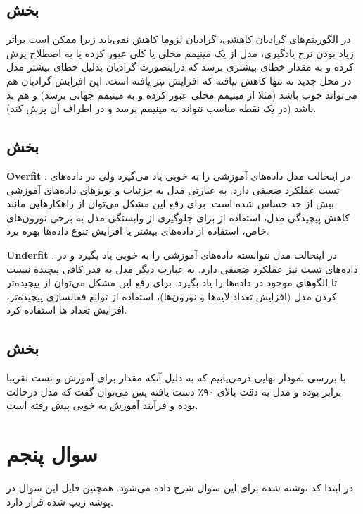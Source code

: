 \documentclass[12pt]{article}
\begin{document}
	\subsection{بخش }
	در الگوریتم‌های گرادیان کاهشی، گرادیان لزوما کاهش نمی‌یابد زیرا ممکن است براثر زیاد بودن نرخ یادگیری، مدل از یک مینیمم محلی یا کلی عبور کرده یا به اصطلاح پرش کرده و به مقدار خطای بیشتری برسد که دراینصورت گرادیان بدلیل خطای بیشتر مدل در محل جدید نه تنها کاهش نیافته که افزایش نیز یافته است. این افزایش گرادیان هم می‌تواند خوب باشد (مثلا از مینیمم محلی عبور کرده و به مینیمم جهانی برسد) و هم بد باشد (در یک نقطه مناسب نتواند به مینیمم برسد و در اطراف آن پرش کند).
	\subsection{بخش }
	\textbf{Overfit} : در اینحالت مدل داده‌های آموزشی  را به خوبی یاد می‌گیرد ولی در داده‌های تست عملکرد ضعیفی دارد. به عبارتی مدل به جزئیات و نویزهای داده‌های آموزشی بیش از حد حساس شده است. برای رفع این مشکل می‌توان از راهکارهایی مانند کاهش پیچیدگی مدل، استفاده از  برای جلوگیری از وابستگی مدل به برخی نورون‌های خاص، استفاده از داده‌های بیشتر یا افزایش تنوع داده‌ها بهره برد.
	
	\textbf{Underfit} : در اینحالت مدل نتوانسته داده‌های آموزشی را به خوبی یاد بگیرد و در داده‌های تست نیز عملکرد ضعیفی دارد. به عبارت دیگر مدل به قدر کافی پیچیده نیست تا الگوهای موجود در داده‌ها را یاد بگیرد. برای رفع این مشکل می‌توان از پیچیده‌تر کردن مدل (افزایش تعداد لایه‌ها و نورون‌ها)، استفاده از توابع فعالسازی پیچیده‌تر، افزایش تعداد  ها استفاده کرد.
	\subsection{بخش }
	با بررسی نمودار  نهایی درمی‌یابیم که به دلیل آنکه مقدار  برای آموزش و تست تقریبا برابر بوده و مدل به دقت بالای ۹۰٪ دست یافته پس می‌توان گفت که مدل درحالت  بوده و فرآیند آموزش به خوبی پیش رفته است.
	\section{سوال پنجم}
	در ابتدا کد نوشته شده برای این سوال شرح داده می‌شود. همچنین فایل  این سوال در پوشه زیپ شده قرار دارد.
	
\end{document}
